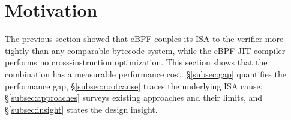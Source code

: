 







\section{Motivation}
\label{sec:motivation}

The previous section showed that eBPF couples its ISA to the verifier more tightly than any comparable bytecode system, while the eBPF JIT compiler performs no cross-instruction optimization. This section shows that the combination has a measurable performance cost.
%
\S\ref{subsec:gap} quantifies the performance gap, \S\ref{subsec:rootcause} traces the underlying ISA cause, \S\ref{subsec:approaches} surveys existing approaches and their limits, and \S\ref{subsec:insight} states the design insight.

